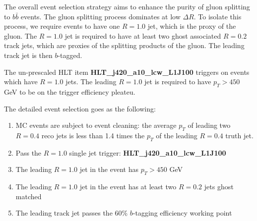 \label{sec:gbb-eventselection}

The overall event selection strategy aims to enhance the purity of gluon splitting to $b \bar b$ events. The gluon splitting process dominates at low $\Delta R$. To isolate this process, we require events to have one $R=1.0$ jet, which is the proxy of the gluon. The $R=1.0$ jet is required to have at least two ghost associated $R=0.2$ track jets, which are proxies of the splitting products of the gluon. The leading track jet is then $b$-tagged. 

The un-prescaled HLT item \textbf{HLT\_j420\_a10\_lcw\_L1J100} triggers on events which have $R=1.0$ jets. The leading $R=1.0$ jet is required to have $p_T>450$ GeV to be on the trigger efficiency pleateu. 

The detailed event selection goes as the following:
\begin{enumerate}
	\item MC events are subject to event cleaning: the average $p_T$ of leading two $R=0.4$ reco jets is less than 1.4 times the $p_T$ of the leading $R=0.4$ truth jet. 
	\item Pass the $R=1.0$ single jet trigger: \textbf{HLT\_j420\_a10\_lcw\_L1J100}
	\item The leading $R=1.0$ jet in the event has $p_T>450$ GeV
        \item The leading $R=1.0$ jet in the event has at least two $R=0.2$ jets ghost matched
	\item The leading track jet passes the 60\% $b$-tagging efficiency working point
\end{enumerate}
